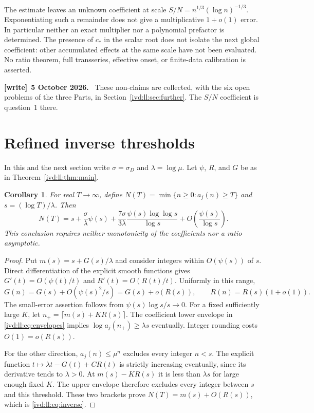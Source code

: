 \documentclass[11pt,letterpaper]{article}
\newtheorem{corollary}[theorem]{Corollary}
\theoremstyle{remark}\newtheorem{remark}[theorem]{Remark}
\numberwithin{equation}{section}
\newenvironment{writenote}[1][]{\par\smallskip\begingroup\small
 \noindent\textbf{[write]}\if\relax\detokenize{#1}\relax\else~\textbf{#1.}\fi\ }%
 {\par\endgroup\smallskip}
\begin{document}
The estimate leaves an unknown coefficient at scale
$S/N=n^{1/3}(\log n)^{-1/3}$. Exponentiating such a remainder does
not give a multiplicative $1+o(1)$ error. In particular neither an
exact multiplier nor a polynomial prefactor is determined. The
presence of $c_*$ in the scalar root does not isolate the next global
coefficient: other accumulated effects at the same scale have not
been evaluated. No ratio theorem, full transseries, effective onset,
or finite-data calibration is asserted.
\begin{writenote}[5 October 2026]
These non-claims are collected, with the six open problems of the three Parts, in Section~\ref{ivd:ll:sec:further}. The $S/N$ coefficient is question~1 there.
\end{writenote}

\section{Refined inverse thresholds}\label{ivd:ll:sec:inverse}
In this and the next section write $\sigma=\sigma_D$ and
$\lambda=\log\mu$. Let $\psi$, $R$, and $G$ be as in
Theorem~\ref{ivd:ll:thm:main}.
\begin{corollary}\label{ivd:ll:cor:inverse}
For real $T\to\infty$, define
$N(T)=\min\{n\ge0:a_j(n)\ge T\}$ and $s=(\log T)/\lambda$.
Then
\begin{equation}\label{ivd:ll:eq:inverse}
 N(T)=s+\frac\sigma\lambda\psi(s)
       +\frac{7\sigma}{3\lambda}
          \frac{\psi(s)\log\log s}{\log s}
       +O\!\left(\frac{\psi(s)}{\log s}\right).
\end{equation}
This conclusion requires neither monotonicity of the coefficients
nor a ratio asymptotic.
\end{corollary}
\begin{proof}
Put $m(s)=s+G(s)/\lambda$ and consider integers within
$O(\psi(s))$ of $s$. Direct differentiation of the explicit smooth
functions gives $G'(t)=O(\psi(t)/t)$ and
$R'(t)=O(R(t)/t)$. Uniformly in this range,
\[
 G(n)=G(s)+O(\psi(s)^2/s)=G(s)+o(R(s)),\qquad
 R(n)=R(s)(1+o(1)).
\]
The small-error assertion follows from
$\psi(s)\log s/s\to0$. For a fixed sufficiently large $K$, let
$n_+=\lceil m(s)+KR(s)\rceil$. The coefficient lower envelope
in \eqref{ivd:ll:eq:envelopes} implies
$\log a_j(n_+)\ge\lambda s$ eventually. Integer rounding costs
$O(1)=o(R(s))$.

For the other direction, $a_j(n)\le\mu^n$ excludes every
integer $n<s$. The explicit function
$t\mapsto\lambda t-G(t)+CR(t)$ is strictly increasing eventually,
since its derivative tends to $\lambda>0$. At
$m(s)-KR(s)$ it is less than $\lambda s$ for large enough
fixed $K$. The upper envelope therefore excludes every integer
between $s$ and this threshold. These two brackets prove
$N(T)=m(s)+O(R(s))$, which is \eqref{ivd:ll:eq:inverse}.
\end{proof}
\end{document}
